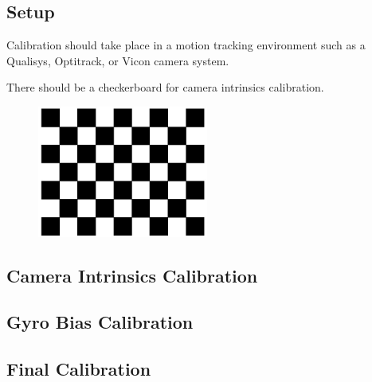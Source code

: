 \documentclass[11pt]{article}
\begin{document}
\subsection{Setup}
Calibration should take place in a motion tracking environment such as a Qualisys, Optitrack, or Vicon camera system.

There should be a checkerboard for camera intrinsics calibration.
\begin{figure}[H]
\centering
\includegraphics[width=0.5\textwidth]{checkerboard}
\end{figure}

\subsection{Camera Intrinsics Calibration}

\subsection{Gyro Bias Calibration}
\subsection{Final Calibration}
\end{document}
